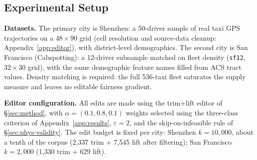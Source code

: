 \subsection{Experimental Setup}\label{sec:exp-setup}
\textbf{Datasets.} The primary city is Shenzhen: a 50-driver sample of real
taxi GPS trajectories on a $48{\times}90$ grid (cell resolution and
source-data cleanup: Appendix~\ref{app:editor}), with district-level
demographics.
The second city is San Francisco (Cabspotting): a 12-driver
subsample matched on fleet density (\texttt{sf12}, $32{\times}30$ grid), with
the same demographic feature names filled from ACS tract values. Density matching is
required: the full 536-taxi fleet saturates the supply measure and leaves
no editable fairness gradient.


\textbf{Editor configuration.} All edits are made using the trim+lift editor of
\S\ref{sec:method}, with $\alpha = (0.1, 0.8, 0.1)$ weights selected using the 
three-class criterion of Appendix~\ref{app:results}, $\varepsilon = 2$, and the 
skip-on-infeasible rule of \S\ref{sec:phys-validity}. The edit budget is fixed
per city: Shenzhen $k = 10{,}000$, about a tenth
of the corpus (2{,}337 trim + 7{,}545 lift after filtering); San Francisco
$k = 2{,}000$ (1{,}330 trim + 629 lift).

